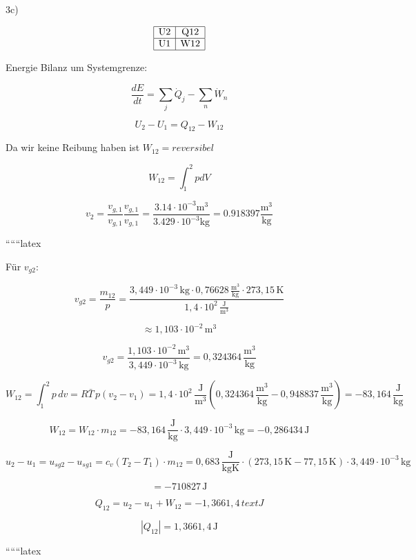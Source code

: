 3c)

\[
\begin{array}{|c|c|}
\hline
\text{U2} & \text{Q12} \\
\hline
\text{U1} & \text{W12} \\
\hline
\end{array}
\]

Energie Bilanz um Systemgrenze:

\[
\frac{dE}{dt} = \sum_j \dot{Q}_j - \sum_n \dot{W}_n
\]

\[
U_2 - U_1 = Q_{12} - W_{12}
\]

Da wir keine Reibung haben ist $W_{12} = reversibel$

\[
W_{12} = \int_1^2 p dV
\]

\[
v_2 = \frac{v_{g,1}}{v_{g,1}} \frac{v_{g,1}}{v_{g,1}} = \frac{3.14 \cdot 10^{-3} \text{m}^3}{3.429 \cdot 10^{-3} \text{kg}} = 0.918397 \frac{\text{m}^3}{\text{kg}}
\]

``````latex


Für $v_{g2}$:

\[
v_{g2} = \frac{m_{12}}{p} = \frac{3{,}449 \cdot 10^{-3} \, \text{kg} \cdot 0{,}76628 \, \frac{\text{m}^3}{\text{kg}} \cdot 273{,}15 \, \text{K}}{1{,}4 \cdot 10^2 \, \frac{\text{J}}{\text{m}^3}}
\]

\[
\approx 1{,}103 \cdot 10^{-2} \, \text{m}^3
\]

\[
v_{g2} = \frac{1{,}103 \cdot 10^{-2} \, \text{m}^3}{3{,}449 \cdot 10^{-3} \, \text{kg}} = 0{,}324364 \, \frac{\text{m}^3}{\text{kg}}
\]

\[
W_{12} = \int_{1}^{2} p \, dv = R \bar{T} \, p (v_2 - v_1) = 1{,}4 \cdot 10^2 \, \frac{\text{J}}{\text{m}^3} \left( 0{,}324364 \, \frac{\text{m}^3}{\text{kg}} - 0{,}948837 \, \frac{\text{m}^3}{\text{kg}} \right) = -83{,}164 \, \frac{\text{J}}{\text{kg}}
\]

\[
W_{12} = W_{12} \cdot m_{12} = -83{,}164 \, \frac{\text{J}}{\text{kg}} \cdot 3{,}449 \cdot 10^{-3} \, \text{kg} = -0{,}286434 \, \text{J}
\]

\[
u_2 - u_1 = u_{sg2} - u_{sg1} = c_v (T_2 - T_1) \cdot m_{12} = 0{,}683 \, \frac{\text{J}}{\text{kgK}} \cdot (273{,}15 \, \text{K} - 77{,}15 \, \text{K}) \cdot 3{,}449 \cdot 10^{-3} \, \text{kg}
\]

\[
= -710827 \, \text{J}
\]

\[
Q_{12} = u_2 - u_1 + W_{12} = -1{,}3661{,}4 \,text{J}
\]

\[
|Q_{12}| = 1{,}3661{,}4 \, \text{J}
\]

``````latex

